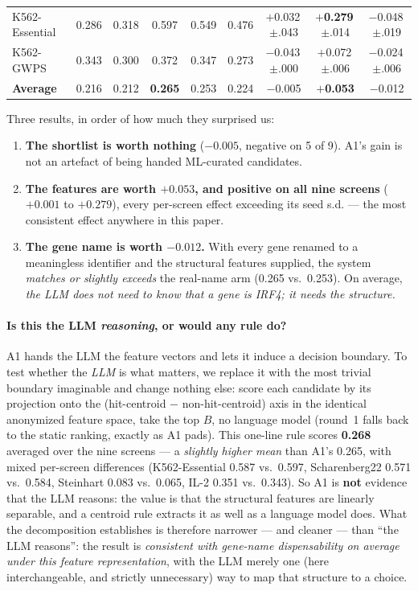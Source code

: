 \documentclass[11pt]{article}
\begin{document}
\begin{table}[H]
\begin{tabular}{lccccc|ccc}
K562-Essential & 0.286 & 0.318 & 0.597 & 0.549 & 0.476 & $+$0.032\,{\tiny$\pm$.043} & \textbf{$+$0.279}\,{\tiny$\pm$.014} & $-$0.048\,{\tiny$\pm$.019} \\
K562-GWPS      & 0.343 & 0.300 & 0.372 & 0.347 & 0.273 & $-$0.043\,{\tiny$\pm$.000} & $+$0.072\,{\tiny$\pm$.006} & $-$0.024\,{\tiny$\pm$.006} \\
\midrule
\textbf{Average} & 0.216 & 0.212 & \textbf{0.265} & 0.253 & 0.224 & $-$0.005 & \textbf{$+$0.053} & $-$0.012 \\
\bottomrule
\end{tabular}
\end{table}

\noindent
Three results, in order of how much they surprised us:

\begin{enumerate}\itemsep2pt
  \item \textbf{The shortlist is worth nothing} ($-0.005$, negative on 5 of 9). A1's gain is not an
  artefact of being handed ML-curated candidates.
  \item \textbf{The features are worth $+0.053$, and positive on all nine screens} ($+0.001$ to
  $+0.279$), every per-screen effect exceeding its seed s.d. --- the most consistent effect anywhere
  in this paper.
  \item \textbf{The gene name is worth $-0.012$.} With every gene renamed to a meaningless identifier
  and the structural features supplied, the system \emph{matches or slightly exceeds} the real-name
  arm (0.265 vs.\ 0.253). On average, \emph{the LLM does not need to know that a gene is IRF4; it needs
  the structure.}
\end{enumerate}

\paragraph{Is this the LLM \emph{reasoning}, or would any rule do?} A1 hands the LLM the feature vectors
and lets it induce a decision boundary. To test whether the \emph{LLM} is what matters, we replace it
with the most trivial boundary imaginable and change nothing else: score each candidate by its
projection onto the (hit-centroid $-$ non-hit-centroid) axis in the identical anonymized feature space,
take the top $B$, no language model (round~1 falls back to the static ranking, exactly as A1 pads). This
one-line rule scores \textbf{0.268} averaged over the nine screens --- a \emph{slightly higher mean} than
A1's 0.265, with mixed per-screen differences (K562-Essential 0.587 vs.\ 0.597, Scharenberg22 0.571 vs.\
0.584, Steinhart 0.083 vs.\ 0.065, IL-2 0.351 vs.\ 0.343). So A1 is \textbf{not} evidence that the LLM reasons:
the value is that the structural features are linearly separable, and a centroid rule extracts it as
well as a language model does. What the decomposition establishes is therefore narrower --- and cleaner
--- than ``the LLM reasons'': the result is \emph{consistent with gene-name dispensability on average
under this feature representation}, with the LLM merely one (here interchangeable, and strictly
unnecessary) way to map that structure to a choice.
\end{document}
